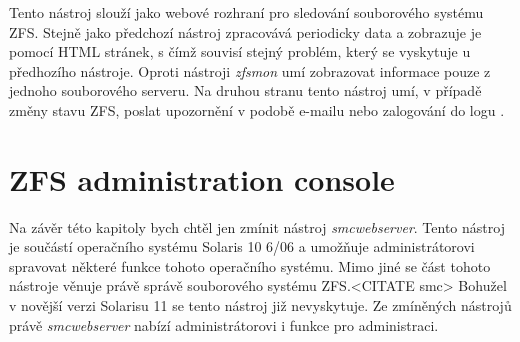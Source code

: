 Tento nástroj slouží jako webové rozhraní pro sledování souborového systému ZFS. Stejně jako předchozí nástroj zpracovává periodicky data a zobrazuje je pomocí HTML stránek, s čímž souvisí stejný problém, který se vyskytuje u předhozího nástroje. Oproti nástroji \emph{zfsmon} umí zobrazovat informace pouze z jednoho souborového serveru. Na druhou stranu tento nástroj umí, v případě změny stavu ZFS, poslat upozornění v podobě e-mailu nebo zalogování do logu \cite{zfswatcher}.
\section{ZFS administration console}
Na závěr této kapitoly bych chtěl jen zmínit nástroj \emph{smcwebserver}. Tento nástroj je součástí operačního systému Solaris 10 6/06 a umožňuje administrátorovi spravovat některé funkce tohoto operačního systému. Mimo jiné se část tohoto nástroje věnuje právě správě souborového systému ZFS.<CITATE smc> Bohužel v novější verzi Solarisu 11 se tento nástroj již nevyskytuje. Ze zmíněných nástrojů právě \emph{smcwebserver} nabízí administrátorovi i funkce pro administraci. 